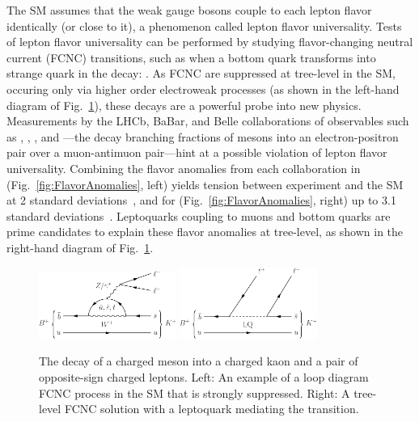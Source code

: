 
The SM assumes that the weak gauge bosons couple to each lepton flavor identically (or close to it), a phenomenon called lepton flavor universality. Tests of lepton flavor universality can be performed by studying flavor-changing neutral current (FCNC) transitions, such as when a bottom quark transforms into strange quark in the decay: \HepProcess{\PB \to \PK\Pleptonplus\Pleptonminus}. As FCNC are suppressed at tree-level in the SM, occuring only via higher order electroweak processes (as shown in the left-hand diagram of Fig.~\ref{fig:FCNC}), these decays are a powerful probe into new physics. Measurements by the LHCb, BaBar, and Belle collaborations of observables such as \Ratio{\PK}, \Ratio{\PKstar}, \Ratio{\PD}, and \Ratio{\PDstar}---the decay branching fractions of \PB mesons into an electron-positron pair over a muon-antimuon pair---hint at a possible violation of lepton flavor universality. Combining the flavor anomalies from each collaboration in \Ratio{\PKstar} (Fig.~\ref{fig:FlavorAnomalies}, left) yields tension between experiment and the SM at 2 standard deviations~\cite{LHCb1}, and for \Ratio{\PK} (Fig.~\ref{fig:FlavorAnomalies}, right) up to 3.1 standard deviations~\cite{LHCb2}. Leptoquarks coupling to muons and bottom quarks are prime candidates to explain these flavor anomalies at tree-level, as shown in the right-hand diagram of Fig.~\ref{fig:FCNC}.

\begin{figure}[H]
    \centering
    {\includegraphics[width=0.4\textwidth]{Images/Theory/BplusDecayFCNC.pdf}\hspace{0.1\textwidth}}
    {\includegraphics[width=0.4\textwidth]{Images/Theory/BplusDecayLQ.pdf}}
    \caption{The decay of a charged \PB meson into a charged kaon and a pair of opposite-sign charged leptons. Left: An example of a loop diagram FCNC process in the SM that is strongly suppressed. Right: A tree-level FCNC solution with a leptoquark mediating the transition.}
    \label{fig:FCNC}
\end{figure}

